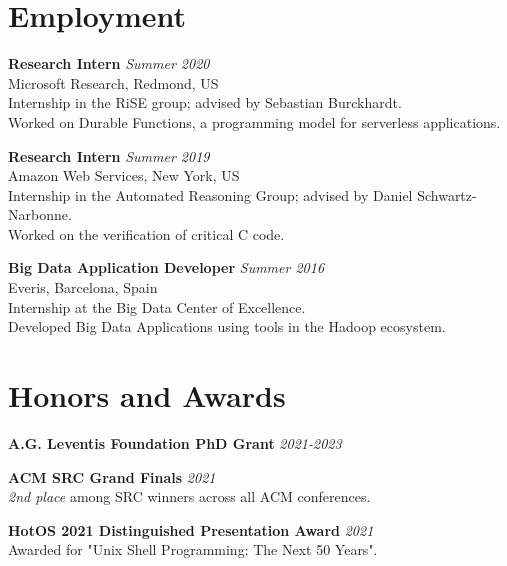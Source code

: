 \documentclass[margin]{res}
\begin{document}
\begin{resume}



\section{Employment}

\textbf{Research Intern}  \hfill {\em Summer 2020} \\
Microsoft Research, Redmond, US \\
Internship in the RiSE group; advised by Sebastian Burckhardt. \\
Worked on Durable Functions, a programming model for serverless applications.

\textbf{Research Intern}  \hfill {\em Summer 2019} \\
Amazon Web Services, New York, US \\
Internship in the Automated Reasoning Group; advised by Daniel Schwartz-Narbonne. \\
Worked on the verification of critical C code.


\textbf{Big Data Application Developer}  \hfill {\em Summer 2016} \\
Everis, Barcelona, Spain \\
Internship at the Big Data Center of Excellence. \\
Developed Big Data Applications using tools in the Hadoop ecosystem.

\section{Honors and Awards}

\textbf{A.G. Leventis Foundation PhD Grant} \hfill {\em 2021-2023}

\textbf{ACM SRC Grand Finals} \hfill {\em 2021} \\
\textit{2nd place} among SRC winners across all ACM conferences.

\textbf{HotOS 2021 Distinguished Presentation Award} \hfill {\em 2021} \\
Awarded for "Unix Shell Programming: The Next 50 Years".


\end{resume}
\end{document}
